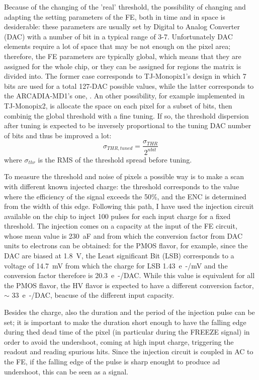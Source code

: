         Because of the changing of the 'real' threshold, the possibility of changing and adapting the setting parameters of the FE, both in time and in space is desiderable: these parameters are usually set by Digital to Analog Converter (DAC) with a number of bit in a typical range of 3-7.
        Unfortunately DAC elements require a lot of space that may be not enough on the pixel area; therefore, the FE parameters are typically global, which means that they are assigned for the whole chip, or they can be assigned for regions the matrix is divided into. 
        The former case corresponds to TJ-Monopix1's design in which 7 bits are used for a total 127-DAC possible values, while the latter corresponds to the ARCADIA-MD1's one, . 
        An other possibility, for example implemented in TJ-Monopix2, is allocate the space on each pixel for a subset of bits, then combinig the global threshold with a fine tuning. 
        If so, the threshold dispersion after tuning is expected to be inversely proportional to the tuning DAC number of bits and thus be improved a lot:
        \begin{equation}
            \sigma_{THR, tuned} = \frac{\sigma_{THR}}{2^{n bit}}
        \end{equation}    
        where $\sigma_{thr}$ 
        is the RMS of the threshold spread before tuning.

        To measure the threshold and noise of pixels a possible way is to make a scan with different known injected charge: the threshold corresponds to the value where the efficiency of the signal exceeds the 50\%, and the ENC is determined from the width of this edge.        
        Following this path, I have used the injection circuit available on the chip to inject 100 pulses for each input charge for a fixed threshold.
        The injection comes on a capacity at the input of the FE circuit, whose mean value is \SI{230}{aF} and from which the conversion factor from DAC units to electrons can be obtained: for the PMOS flavor, for example, since the DAC are biased at \SI{1.8}{V}, the Least significant Bit (LSB) corresponds to a voltage of \SI{14.7}{mV} from which the charge for LSB \SI{1.43}{e-/mV} and the conversion factor therefore is \SI{20.3}{e-/DAC}.     
        While this value is equivalent for all the PMOS flavor, the HV flavor is expected to have a different conversion factor, $\sim$ \SI{33}{e-/DAC}, beacuse of the different input capacity. 

        Besides the charge, also the duration and the period of the injection pulse can be set; it is important to make the duration short enough to have the falling edge during thed dead time of the pixel (in particular during the FREEZE signal) in order to avoid the undershoot, coming at high input charge, triggering the readout and reading spurious hits. 
        Since the injection circuit is coupled in AC to the FE, if the falling edge of the pulse is sharp enought to produce ad undershoot, this can be seen as a signal. 

